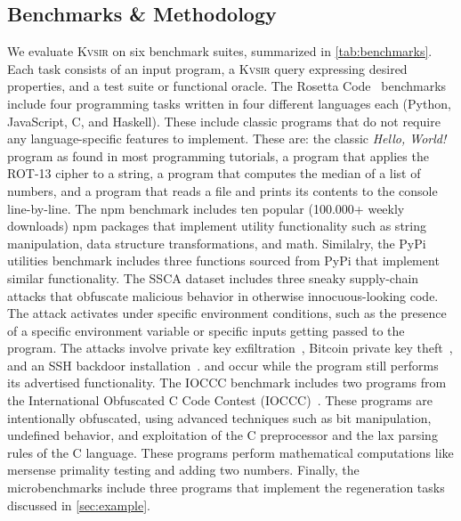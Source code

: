 \documentclass[noacm,sigplan,review]{acmart}
\newcommand{\sys}{{\scshape Kv{\textalpha}sir}\xspace}
\begin{document}
\subsection{Benchmarks \& Methodology}

We evaluate \sys on six benchmark suites, summarized in \cref{tab:benchmarks}.
Each task consists of an input program, a \sys query expressing desired
properties, and a test suite or functional oracle.
The Rosetta Code~\cite{rosettacode} benchmarks include four programming tasks written in four different
languages each (Python, JavaScript, C, and Haskell). 
These include classic programs that do not require any language-specific features to implement.
These are: the classic \emph{Hello, World!} program as found in most programming tutorials,
a program that applies the ROT-13 cipher to a string,
a program that computes the median of a list of numbers,
and a program that reads a file and prints its contents to the console line-by-line.
The npm benchmark includes ten popular (100.000+ weekly downloads) npm packages that implement utility
functionality such as string manipulation, data structure transformations, and math.
Similalry, the PyPi utilities benchmark includes three functions sourced from PyPi that implement similar functionality.
The SSCA dataset includes three sneaky supply-chain attacks that obfuscate malicious behavior in otherwise innocuous-looking code.
The attack activates under specific environment conditions, such as the presence of a specific environment variable or specific inputs
getting passed to the program. The attacks involve private key exfiltration~\cite{ohm2020backstabber}, Bitcoin private key theft~\cite{ev:eurosec:2022}, and an SSH backdoor installation~\cite{copeland2019frightening}.
and occur while the program still performs its advertised functionality.
The IOCCC benchmark includes two programs from the International Obfuscated C Code Contest (IOCCC)~\cite{ioccc}.
These programs are intentionally obfuscated, using advanced techniques such as bit manipulation, undefined behavior,
and exploitation of the C preprocessor and the lax parsing rules of the C language.
These programs perform mathematical computations like mersense primality testing and adding two numbers.
Finally, the microbenchmarks include three programs that implement the regeneration tasks discussed in \cref{sec:example}.
\end{document}
